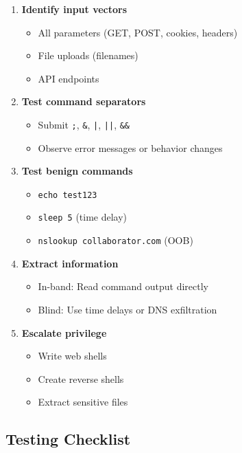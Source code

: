 \documentclass[12pt]{article}
\begin{document}
\begin{enumerate}
    \item \textbf{Identify input vectors}
    \begin{itemize}
        \item All parameters (GET, POST, cookies, headers)
        \item File uploads (filenames)
        \item API endpoints
    \end{itemize}
    
    \item \textbf{Test command separators}
    \begin{itemize}
        \item Submit \texttt{;}, \texttt{\&}, \texttt{|}, \texttt{||}, \texttt{\&\&}
        \item Observe error messages or behavior changes
    \end{itemize}
    
    \item \textbf{Test benign commands}
    \begin{itemize}
        \item \texttt{echo test123}
        \item \texttt{sleep 5} (time delay)
        \item \texttt{nslookup collaborator.com} (OOB)
    \end{itemize}
    
    \item \textbf{Extract information}
    \begin{itemize}
        \item In-band: Read command output directly
        \item Blind: Use time delays or DNS exfiltration
    \end{itemize}
    
    \item \textbf{Escalate privilege}
    \begin{itemize}
        \item Write web shells
        \item Create reverse shells
        \item Extract sensitive files
    \end{itemize}
\end{enumerate}

\subsection{Testing Checklist}
\end{document}
